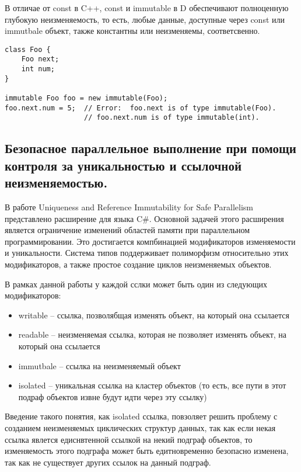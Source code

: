 В отличае от const в C++, const и immutable в D обеспечивают полноценную глубокую неизменяемость, то есть, любые данные, доступные через const или immutbale объект, также константны или неизменяемы, соответсвенно.

\begin{lstlisting}[caption=const vs immutable, label=code:d_const_vs_immutable]
class Foo {
    Foo next;
    int num;
}
 
immutable Foo foo = new immutable(Foo);
foo.next.num = 5;  // Error:  foo.next is of type immutable(Foo).
                   // foo.next.num is of type immutable(int).
\end{lstlisting}

\subsection{Безопасное параллельное выполнение при помощи контроля за уникальностью и ссылочной неизменяемостью.}

В работе Uniqueness and Reference Immutability for Safe Parallelism \cite{Gordon2012} представлено расширение для языка C\#. Основной задачей этого расширения является ограничение изменений областей памяти при параллельном программировании. Это достигается компбинацией модификаторов изменяемости и уникальности. Система типов поддерживает полиморфизм относительно этих модификаторов, а также простое создание циклов неизменяемых объектов.

В рамках данной работы у каждой сслки может быть один из следующих модификаторов:
\begin{itemize}
\item writable -- ссылка, позволябщая изменять объект, на который она ссылается
\item readable -- неизменяемая ссылка, которая не позволяет изменять объект, на который она ссылается
\item immutbale -- ссылка на неизменяемый объект
\item isolated -- уникальная ссылка на кластер объектов (то есть, все пути в этот подраф объектов извне будут идти через эту ссылку)
\end{itemize}

Введение такого понятия, как isolated ссылка, повзоляет решить проблему с созданием неизменяемых циклических структур данных, так как если некая ссылка явлется едиснвтенной ссылкой на некий подграф объектов, то изменяемость этого подграфа может быть едитновременно безопасно изменена, так как не существует других ссылок на данный подграф. 

